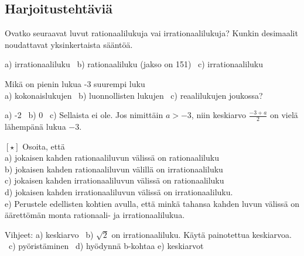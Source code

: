 \subsection*{Harjoitustehtäviä}

\begin{tehtava}
Ovatko seuraavat luvut rationaalilukuja vai irrationaalilukuja? Kunkin desimaalit
noudattavat yksinkertaista sääntöä.
\begin{alakohdat}
\end{alakohdat}
\begin{vastaus}
a) irrationaaliluku \ b) rationaaliluku (jakso on 151) \ c) irrationaaliluku
\end{vastaus}
\end{tehtava}

\begin{tehtava}
Mikä on pienin lukua -3 suurempi luku \\
a) kokonaislukujen \ b) luonnollisten lukujen \ c) reaalilukujen joukossa?
\begin{vastaus}
a) -2 \ b) 0 \ c) Sellaista ei ole. Jos nimittäin $a > -3$, niin keskiarvo
$\frac{-3+a}{2}$ on vielä lähempänä lukua $-3$. 
\end{vastaus}
\end{tehtava}

\begin{tehtava}
$\boldsymbol{[\star]}$ Osoita, että \\
a) jokaisen kahden rationaaliluvun välissä on rationaaliluku \\
b) jokaisen kahden rationaaliluvun välillä on irrationaaliluku \\
c) jokaisen kahden irrationaaliluvun välissä on rationaaliluku \\
d) jokaisen kahden irrationaaliluvun välissä on irrationaaliluku. \\
e) Perustele edellisten kohtien avulla, että minkä tahansa kahden luvun
välissä on äärettömän monta rationaali- ja irrationaalilukua.
\begin{vastaus}
Vihjeet: a) keskiarvo \ b) $\sqrt{2}$ on irrationaaliluku. Käytä
painotettua keskiarvoa. \ c) pyöristäminen \ d) hyödynnä b-kohtaa
e) keskiarvot
\end{vastaus}
\end{tehtava}
